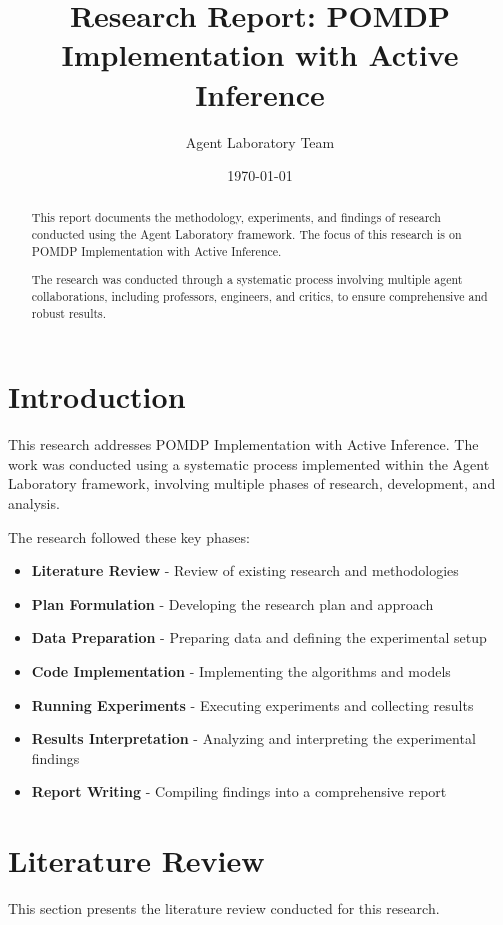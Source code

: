 \documentclass[11pt,a4paper]{article}
\title{Research Report: POMDP Implementation with Active Inference}
\author{Agent Laboratory Team}
\date{\today}
\begin{document}
\maketitle

\begin{abstract}
This report documents the methodology, experiments, and findings of research conducted using the Agent Laboratory framework. The focus of this research is on POMDP Implementation with Active Inference.

The research was conducted through a systematic process involving multiple agent collaborations, including professors, engineers, and critics, to ensure comprehensive and robust results.
\end{abstract}

\tableofcontents
\newpage

\section{Introduction}
This research addresses POMDP Implementation with Active Inference. The work was conducted using a systematic process implemented within the Agent Laboratory framework, involving multiple phases of research, development, and analysis.

The research followed these key phases:
\begin{itemize}
\item \textbf{Literature Review} - Review of existing research and methodologies
\item \textbf{Plan Formulation} - Developing the research plan and approach
\item \textbf{Data Preparation} - Preparing data and defining the experimental setup
\item \textbf{Code Implementation} - Implementing the algorithms and models
\item \textbf{Running Experiments} - Executing experiments and collecting results
\item \textbf{Results Interpretation} - Analyzing and interpreting the experimental findings
\item \textbf{Report Writing} - Compiling findings into a comprehensive report
\end{itemize}

\section{Literature Review}
This section presents the literature review conducted for this research.
\end{document}
